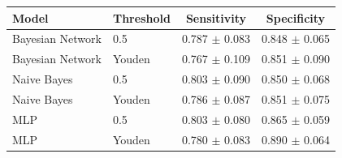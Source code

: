 \begin{tabular}{llcc}
\toprule
Model & Threshold & Sensitivity & Specificity \\
\midrule
Bayesian Network & 0.5 & 0.787 $\pm$ 0.083 & 0.848 $\pm$ 0.065 \\
Bayesian Network & Youden & 0.767 $\pm$ 0.109 & 0.851 $\pm$ 0.090 \\
Naive Bayes & 0.5 & 0.803 $\pm$ 0.090 & 0.850 $\pm$ 0.068 \\
Naive Bayes & Youden & 0.786 $\pm$ 0.087 & 0.851 $\pm$ 0.075 \\
MLP & 0.5 & 0.803 $\pm$ 0.080 & 0.865 $\pm$ 0.059 \\
MLP & Youden & 0.780 $\pm$ 0.083 & 0.890 $\pm$ 0.064 \\
\bottomrule
\end{tabular}
